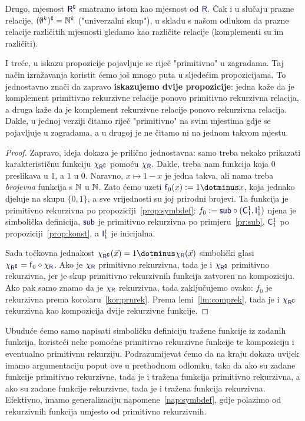 Drugo, mjesnost  $\f R\kompl$ smatramo istom kao mjesnost od $\f R$. Čak i u slučaju prazne relacije, $(\emptyset^k)\sp{{\scriptscriptstyle\complement}}={\mathbb N}^k$ ("univerzalni skup"), u skladu s našom odlukom da prazne relacije različitih mjesnosti gledamo kao različite relacije (komplementi su im različiti).

I treće, u iskazu propozicije pojavljuje se riječ "primitivno" u zagradama. Taj način izražavanja koristit ćemo još mnogo puta u sljedećim propozicijama. To jednostavno znači da zapravo \textbf{iskazujemo dvije propozicije}: jedna kaže da je komplement primitivno rekurzivne relacije ponovo primitivno rekurzivna relacija, a druga kaže da je komplement rekurzivne relacije ponovo rekurzivna relacija. Dakle, u jednoj verziji čitamo riječ "primitivno" na svim mjestima gdje se pojavljuje u zagradama, a u drugoj je ne čitamo ni na jednom takvom mjestu.

\begin{proof}
Zapravo, ideja dokaza je prilično jednostavna: samo treba nekako prikazati karakterističnu funkciju $\chi_{\f R\kompl}$ pomoću $\chi_{\f R}$. Dakle, treba nam funkcija koja $0$ preslikava u $1$, a $1$ u $0$. Naravno, $x\mapsto1-x$ je jedna takva, ali nama treba \emph{brojevna} funkcija s ${\mathbb N}$ u ${\mathbb N}$. Zato ćemo uzeti $\f f_0(x):=1\dotminus x$, koja jednako djeluje na skupu $\{0,1\}$, a sve vrijednosti su joj prirodni brojevi. Ta funkcija je primitivno rekurzivna po propoziciji~\ref{prop:symbdef}: $f_0:=\f{sub}\circ(\f C_1^1,\f I_1^1)$ njena je simbolička definicija, $\f{sub}$ je primitivno rekurzivna po primjeru~\ref{pr:sub}, $\f C_1^1$ po propoziciji~\ref{prop:konst}, a $\f I_1^1$ je inicijalna.

Sada točkovna jednakost $\chi_{\f R\kompl}(\vec x)=1\dotminus\chi_{\f R}(\vec x)$ simbolički glasi $\chi_{\f R\kompl}=\f f_0\circ\chi_{\f R}$. Ako je $\chi_{\f R}$ primitivno rekurzivna, tada je i $\chi_{\f R\kompl}$ primitivno rekurzivna, jer je skup primitivno rekurzivnih funkcija zatvoren na kompoziciju.
Ako pak samo znamo da je $\chi_{\f R}$ rekurzivna, tada zaključujemo ovako: $f_0$ je rekurzivna prema korolaru~\ref{kor:prnrek}. Prema lemi~\ref{lm:comprek}, tada je i $\chi_{\f R\kompl}$ rekurzivna kao kompozicija dvije rekurzivne funkcije.
\end{proof}

Ubuduće ćemo samo napisati simboličku definiciju tražene funkcije iz zadanih funkcija, koristeći neke pomoćne primitivno rekurzivne funkcije te kompoziciju i eventualno primitivnu rekurziju. Podrazumijevat ćemo da na kraju dokaza uvijek imamo argumentaciju poput ove u prethodnom odlomku, tako da ako su zadane funkcije primitivno rekurzivne, tada je i tražena funkcija primitivno rekurzivna, a ako su zadane funkcije rekurzivne, tada je i tražena funkcija rekurzivna. Efektivno, imamo generalizaciju napomene~\ref{nap:symbdef}, gdje polazimo od rekurzivnih funkcija umjesto od primitivno rekurzivnih.

